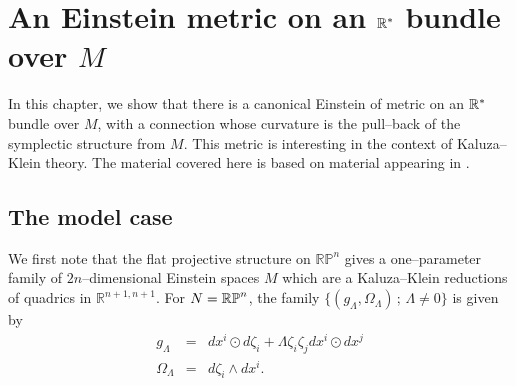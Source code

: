 
\chapter{An Einstein metric on an $\mathbb{R}^*$ bundle over $M$}
\label{chap:KK_lift}
In this chapter, we show that there is a canonical Einstein of metric on an $\mathbb{R}^*$ bundle over $M$, with a connection whose curvature is the pull--back
of the symplectic structure from $M$. This metric is interesting in the context of Kaluza--Klein theory. The material covered here is based on material appearing in \cite{DW}.


\section{The model case} \label{sec:quadric}

We first note that the flat projective structure on $\mathbb{RP}^{n}$ gives a one--parameter family of $2n$--dimensional Einstein spaces $M$ which are a Kaluza--Klein reductions of quadrics in $\mathbb{R}^{n+1,n+1}$. For $N=\mathbb{RP}^n$, the family $\{(g_\Lambda,\Omega_\Lambda)\,;\,\Lambda\neq 0\}$ is given by
\begin{eqnarray}
g_{\Lambda} & = &  dx^{i} \odot d\zeta_{i}+\Lambda\zeta_{i}\zeta_j dx^{i}\odot dx^j \label{eq:g_LambdaModel}\\
\Omega_{\Lambda} & = &  d\zeta_{i}\wedge dx^{i}.\nonumber
\end{eqnarray}

